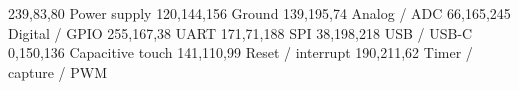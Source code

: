    {239,83,80}   {Power supply}
  {120,144,156} {Ground}
  {139,195,74}  {Analog / ADC}
 {66,165,245}  {Digital / GPIO}
    {255,167,38}  {UART}
     {171,71,188}  {SPI}
     {38,198,218}  {USB / USB-C}
   {0,150,136}   {Capacitive touch}
 {141,110,99}  {Reset / interrupt}
   {190,211,62}  {Timer / capture / PWM}
